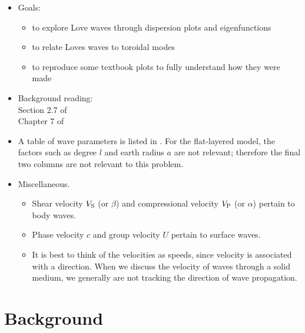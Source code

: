 \documentclass[11pt,titlepage,fleqn]{article}
\begin{document}
\begin{itemize}
\item Goals:
%
\begin{itemize}
\item to explore Love waves through dispersion plots and eigenfunctions
\item to relate Loves waves to toroidal modes
\item to reproduce some textbook plots to fully understand how they were made
\end{itemize}

\item Background reading: \\
Section 2.7 of \citet{SteinWysession} \\
Chapter 7 of \citet{AkiRichardsE2}

\item A table of wave parameters is listed in . For the flat-layered model, the factors such as degree $l$ and earth radius $a$ are not relevant; therefore the final two columns are not relevant to this problem.

\item Miscellaneous.
\begin{itemize}
\item Shear velocity $V_{\rm S}$ (or $\beta$) and compressional velocity $V_{\rm P}$ (or $\alpha$) pertain to body waves.
\item Phase velocity $c$ and group velocity $U$ pertain to surface waves.
\item It is best to think of the velocities as speeds, since velocity is associated with a direction. When we discuss the velocity of waves through a solid medium, we generally are not tracking the direction of wave propagation.
\end{itemize}

\end{itemize}


\pagebreak
\section*{Background}
\end{document}
